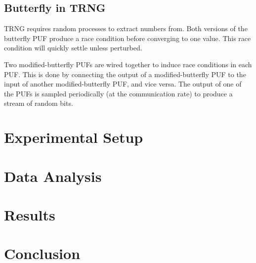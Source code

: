 	\subsection{Butterfly in TRNG}
		TRNG requires random processes to extract numbers from. Both versions of the butterfly PUF produce a race condition before converging to one value. This race condition will quickly settle unless perturbed. 

		Two modified-butterfly PUFs are wired together to induce race conditions in each PUF. This is done by connecting the output of a modified-butterfly PUF to the input of another modified-butterfly PUF, and vice versa. The output of one of the PUFs is sampled periodically (at the communication rate) to produce a stream of random bits. 
		
\section{Experimental Setup} \label{sec::expr}
	
	

\section{Data Analysis}\label{sec::analysis} 

\section{Results}\label{res}

\section{Conclusion}\label{sec::conclusion} 














